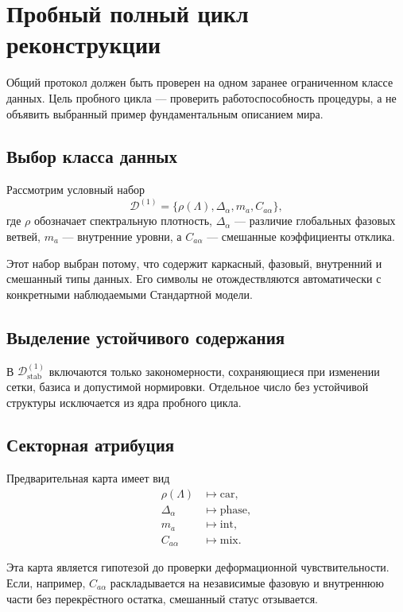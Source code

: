 \chapter{Пробный полный цикл реконструкции}

Общий протокол должен быть проверен на одном заранее ограниченном классе
данных. Цель пробного цикла --- проверить работоспособность процедуры, а не
объявить выбранный пример фундаментальным описанием мира.

\section{Выбор класса данных}

Рассмотрим условный набор
\begin{equation}
 \mathcal D^{(1)}=
 \{\rho(\Lambda),\Delta_\alpha,m_a,C_{a\alpha}\},
\end{equation}
где $\rho$ обозначает спектральную плотность, $\Delta_\alpha$ --- различие
глобальных фазовых ветвей, $m_a$ --- внутренние уровни, а $C_{a\alpha}$ ---
смешанные коэффициенты отклика.

Этот набор выбран потому, что содержит каркасный, фазовый, внутренний и
смешанный типы данных. Его символы не отождествляются автоматически с
конкретными наблюдаемыми Стандартной модели.

\section{Выделение устойчивого содержания}

В $\mathcal D^{(1)}_{\mathrm{stab}}$ включаются только закономерности,
сохраняющиеся при изменении сетки, базиса и допустимой нормировки. Отдельное
число без устойчивой структуры исключается из ядра пробного цикла.

\section{Секторная атрибуция}

Предварительная карта имеет вид
\begin{align}
 \rho(\Lambda)&\longmapsto\mathrm{car},\\
 \Delta_\alpha&\longmapsto\mathrm{phase},\\
 m_a&\longmapsto\mathrm{int},\\
 C_{a\alpha}&\longmapsto\mathrm{mix}.
\end{align}

Эта карта является гипотезой до проверки деформационной чувствительности.
Если, например, $C_{a\alpha}$ раскладывается на независимые фазовую и
внутреннюю части без перекрёстного остатка, смешанный статус отзывается.

